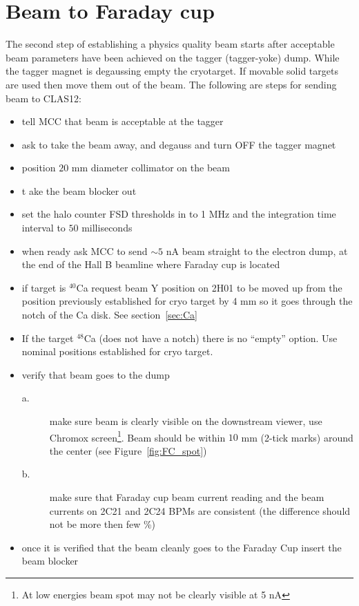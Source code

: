 \clearpage
\section{Beam to Faraday cup}
\indent

The second step of establishing a physics quality beam starts after acceptable beam parameters have been achieved on the tagger (tagger-yoke) dump. While the tagger magnet is degaussing empty the cryotarget. If movable solid targets are used then move them out of the beam. 
The following are steps for sending beam to CLAS12:
\begin{itemize}
\item tell MCC that beam is acceptable at the tagger
\item ask to take the beam away, and degauss and turn OFF the tagger magnet 
\item position $20$ mm diameter collimator on the beam 
\item t ake the beam blocker out
\item set the halo counter FSD thresholds in to 1 MHz and the integration time interval to $50$ milliseconds
\item when ready ask MCC to send $\sim 5$ nA beam straight to the electron dump, at the end of the Hall B beamline where Faraday cup is located 
\item if target is $^{40}$Ca request beam Y position on 2H01 to be moved up from the position previously established for cryo target by 4 mm so it goes through the notch of the Ca disk. See section~\ref{sec:Ca}
\item If the target $^{48}$Ca (does not have a notch) there is no ``empty'' option. Use nominal positions established for cryo target.
\item verify that beam goes to the dump 
\begin{description}
\item[a.] make sure beam is clearly visible on the downstream viewer, use Chromox screen\footnote{At low energies beam spot may not be clearly visible at 5 nA}. Beam should be within $10$ mm (2-tick marks) around the center (see Figure~\ref{fig:FC_spot})
\item[b.] make sure that Faraday cup beam current reading and the beam currents on 2C21 and 2C24 BPMs are consistent (the difference  should not be more then few \%)
\end{description}
\item once it is verified that the beam cleanly goes to the Faraday Cup insert the beam blocker 
\end{itemize}
